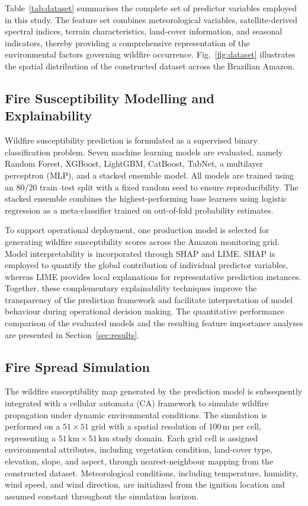 \documentclass{ieeeaccess}
\begin{document}
Table~\ref{tab:dataset} summarises the complete set of predictor variables employed in this study. The feature set combines meteorological variables, satellite-derived spectral indices, terrain characteristics, land-cover information, and seasonal indicators, thereby providing a comprehensive representation of the environmental factors governing wildfire occurrence. Fig.~\ref{fig:dataset} illustrates the spatial distribution of the constructed dataset across the Brazilian Amazon.

\subsection{Fire Susceptibility Modelling and Explainability}

Wildfire susceptibility prediction is formulated as a supervised binary classification problem. Seven machine learning models are evaluated, namely Random Forest, XGBoost, LightGBM, CatBoost, TabNet, a multilayer perceptron (MLP), and a stacked ensemble model. All models are trained using an 80/20 train--test split with a fixed random seed to ensure reproducibility. The stacked ensemble combines the highest-performing base learners using logistic regression as a meta-classifier trained on out-of-fold probability estimates.

To support operational deployment, one production model is selected for generating wildfire susceptibility scores across the Amazon monitoring grid. Model interpretability is incorporated through SHAP and LIME. SHAP is employed to quantify the global contribution of individual predictor variables, whereas LIME provides local explanations for representative prediction instances. Together, these complementary explainability techniques improve the transparency of the prediction framework and facilitate interpretation of model behaviour during operational decision making. The quantitative performance comparison of the evaluated models and the resulting feature importance analyses are presented in Section~\ref{sec:results}.

\subsection{Fire Spread Simulation}

The wildfire susceptibility map generated by the prediction model is subsequently integrated with a cellular automata (CA) framework to simulate wildfire propagation under dynamic environmental conditions. The simulation is performed on a $51 \times 51$ grid with a spatial resolution of 100\,m per cell, representing a $51\,\text{km} \times 51\,\text{km}$ study domain. Each grid cell is assigned environmental attributes, including vegetation condition, land-cover type, elevation, slope, and aspect, through nearest-neighbour mapping from the constructed dataset. Meteorological conditions, including temperature, humidity, wind speed, and wind direction, are initialized from the ignition location and assumed constant throughout the simulation horizon.
\end{document}
